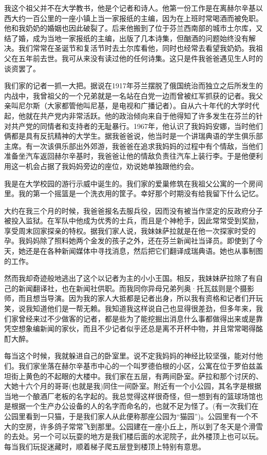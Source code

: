 \documentclass[12pt,UTF8]{ctexbook}
\begin{document}
我这个祖父并不在大学教书，他是个记者和诗人。他第一份工作是在离赫尔辛基以西大约一百公里的一座小镇上当一家报纸的主编，因为在上班时常喝酒而被免职。他和我奶奶的婚姻也因此破裂了。后来他搬到了位于芬兰西南部的城市土尔库，又结了婚，成为当地一家报纸的主编，出版了几本诗集，但酗酒的问题始终没有解决。我们常常在圣诞节和复活节时去土尔库看他，同时也经常去看望我奶奶。我祖父在五年前去世。我可从来没有读过他的任何诗集。这只是件我爸爸遇见生人时的谈资罢了。

我们家的记者一抓一大把。据说在1917年芬兰摆脱了俄国统治而独立之后所发生的内战中，我曾祖父的一个兄弟就是一名站在白党一边而曾被红军抓获的记者。我父亲叫尼尔斯（大家都管他叫尼基，是电视和广播记者）。自从六十年代的大学时代起，他就在共产党内非常活跃。他的政治倾向来自于他得知了许多发生在芬兰的针对共产党的同情者和支持者的无耻暴行。1967年，他认识了我妈妈安娜，当时他们俩都是具有反抗精神的大学生。据我爸爸说，他当时是一个讲瑞典语的学生俱乐部主席。有一次该俱乐部出外郊游，我爸爸在追求我妈妈的过程中有个情敌，当他们准备坐汽车返回赫尔辛基时，我爸爸让他的情敌负责往汽车上装行李。于是他便利用这一机会占据了我妈妈旁边的座位，劝说她单独跟他约会。

我是在大学校园的游行示威中诞生的。我们家的爱巢修筑在我祖父公寓的一个房间里。我的第一个摇篮是一个洗衣用的筐子。幸好那个时期没有给我留下什么记忆。

大约在我三个月的时候，我爸爸报名去服兵役，因而没有被当作坚定的反政府分子被投入监狱。在军队中他成为优秀的士兵，而且是个神枪手，因此常常受到奖励，享受周末回家探亲的特权。据我们家人说，我妹妹萨拉就是在他一次探家时受的孕。我妈妈除了照料她两个金发的孩子之外，还在芬兰新闻社当译员。即使到了今天，她还是在各种新闻媒体中寻找消息，然后把它们翻译成瑞典语。她也从事制图的工作。

然而我却奇迹般地逃出了这个以记者为主的小小王国。相反，我妹妹萨拉除了有自己的新闻翻译社，也在新闻社供职。而我同你异母兄弟列奥·托瓦兹则是个摄影师，而且想当导演。因为我的家人大抵都是记者出身，所以我有资格和记者们开玩笑，说我知道他们是一帮无赖。我知道我这样说自己也显得很差劲，但多年来，我们家曾经来过不少做客的记者，都是些为了能挖掘出消息什么事都做得出来或是靠凭空想象编新闻的家伙，而且不少记者似乎还总是离不开杯中物，并且常常喝得酩酊大醉。

每当这个时候，我就躲进自己的卧室里。说不定我妈妈的神经比较坚强，能对付他们。我们家坐落在赫尔辛基市中心的一个叫罗德伯根的小区，公寓在位于罗伯兹盖坦街上黄色的不起眼的大楼中。我们家在五层，有两间卧室。萨拉和那个讨厌的、大她十六个月的哥哥(也就是我)同住一间卧室。附近有一个小公园，其名字是根据当地一个酿酒厂老板的名字起的。我总觉得这样很奇怪，但一想到有的篮球场馆也是根据一个生产办公设备的人的名字而命名的，也就不足为怪了。(有一次我们在公园里看到一只猫，于是我们家人从此便称那座公园为“猫园”)。公园里有一个不大的空房，许多鸽子常常飞到那里。公园建在一座小丘上，所以到了冬天是个滑雪的去处。另一个可以玩耍的地方是我们楼后面的水泥院子，此外楼顶上也可以玩。每当我们玩捉迷藏时，顺着梯子爬五层登到楼顶上特别有意思。
\end{document}
